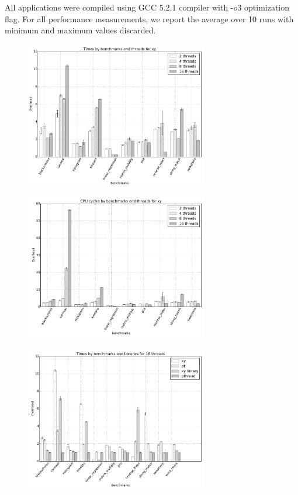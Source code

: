  All applications were compiled using GCC 5.2.1 compiler with -$o3$ optimization flag. For all performance measurements, we report the average over 10 runs with minimum and maximum values discarded.



\begin{figure}[h]
\includegraphics[width=8cm]{figure/benchmarks/times-inspector.pdf}
\end{figure}

\begin{figure}[h]
\includegraphics[width=8cm]{figure/benchmarks/cpu-cycles-inspector.pdf}
\end{figure}

\begin{figure}[h]
\includegraphics[width=8cm]{figure/benchmarks/times-16-threads.pdf}
\end{figure}

